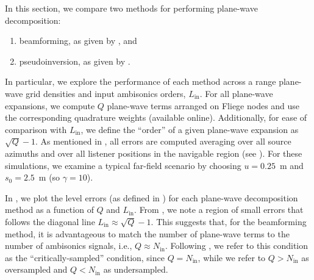 In this section, we compare two methods for performing plane-wave decomposition:
\begin{enumerate}
\item beamforming, as given by , and
\item pseudoinversion, as given by .
\end{enumerate}
In particular, we explore the performance of each method across a range plane-wave grid densities and input ambisonics orders, $L_\text{in}$.
For all plane-wave expansions, we compute $Q$ plane-wave terms arranged on Fliege nodes and use the corresponding quadrature weights (available online).
Additionally, for ease of comparison with $L_\text{in}$, we define the ``order'' of a given plane-wave expansion as $\sqrt{Q} - 1$.
As mentioned in , all errors are computed averaging over all source azimuths and over all listener positions in the navigable region (see ).
For these simulations, we examine a typical far-field scenario by choosing $u = 0.25$~m and $s_0 = 2.5$~m (so $\gamma = 10$).

In , we plot the level errors (as defined in ) for each plane-wave decomposition method as a function of $Q$ and $L_\text{in}$.
From , we note a region of small errors that follows the diagonal line $L_\text{in} \approx \sqrt{Q} - 1$.
This suggests that, for the beamforming method, it is advantageous to match the number of plane-wave terms to the number of ambisonics signals, i.e., $Q \approx N_\text{in}$.
Following \citet{HahnSpors2015b}, we refer to this condition as the ``critically-sampled'' condition, since $Q = N_\text{in}$, while we refer to $Q > N_\text{in}$ as oversampled and $Q < N_\text{in}$ as undersampled.

